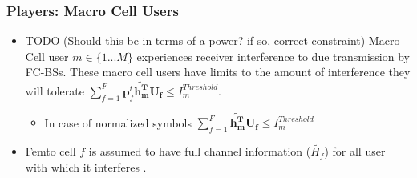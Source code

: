 \documentclass[12pt]{article}
\begin{document}
\subsubsection{Players: Macro Cell Users}

\begin{itemize}
\item 
TODO (Should this be in terms of a power? if so, correct constraint) 
Macro Cell user $m \in \{1 ... M\}$ experiences receiver interference to due transmission by FC-BSs. These macro cell users have limits to the amount of interference they will tolerate 
$\sum^F_{f=1} \mathbf{p}_f^t \mathbf{\tilde{h_m^T}}  \mathbf{U_f}  \leq I^{Threshold}_{m} $.
\begin{itemize}
\item In case of normalized symbols $\sum^F_{f=1}  \mathbf{\tilde{h_m^T}}  \mathbf{U_f}  \leq I^{Threshold}_{m} $
\end{itemize}

\item Femto cell $f$ is assumed to have full channel information ($\tilde{H_f}$) for all user with which it interferes .
\\
\end{itemize}
\end{document}
